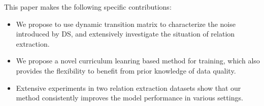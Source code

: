 This paper makes the following specific contributions: 
\begin{itemize}
\item We propose to use dynamic transition matrix to characterize the noise introduced by DS, and extensively investigate the situation of relation extraction.
\item We propose a novel curriculum leanring based method for training, which also provides the flexibility to benefit from prior knowledge of data quality. 
\item Extensive experiments in two relation extraction datasets show that our method consistently improves the model performance in various settings.
\end{itemize}

